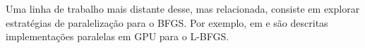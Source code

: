 \documentclass[cic,tc]{iiufrgs}
\begin{document}
Uma linha de trabalho mais distante desse, mas relacionada, consiste em
explorar estratégias de paralelização para o BFGS. Por exemplo, em
\cite{fei2014parallel} e \cite{sanseverino2014cuda} são descritas
implementações paralelas em GPU para o L-BFGS. 

%
%
%
%



\end{document}
